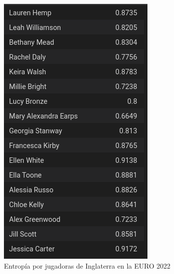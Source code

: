 \begin{figure}[h!]
    \centering
     \includegraphics[width=\textwidth]{./img/entrop_engl.png}
     \caption{Entropía por jugadoras de Inglaterra en la EURO 2022}
     \label{img:ent:eng}
\end{figure}


